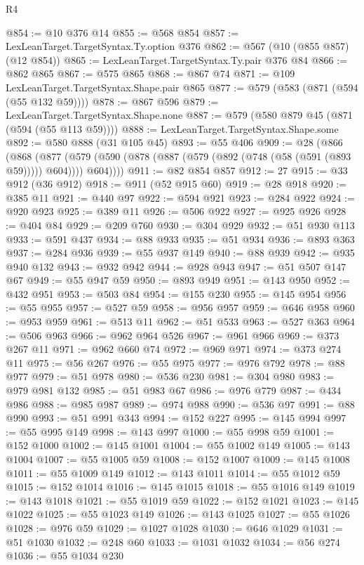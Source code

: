 \begin{lexlean}{R4}
\begin{coremodule}
@854 := @10 @376 @14
@855 := @568 @854
@857 := LexLeanTarget.TargetSyntax.Ty.option @376
@862 := @567 (@10 (@855 @857) (@12 @854))
@865 := LexLeanTarget.TargetSyntax.Ty.pair @376 @84
@866 := @862 @865
@867 := @575 @865
@868 := @867 @74
@871 := @109 LexLeanTarget.TargetSyntax.Shape.pair @865
@877 := @579 (@583 (@871 (@594 (@55 @132 @59))))
@878 := @867 @596
@879 := LexLeanTarget.TargetSyntax.Shape.none
@887 := @579 (@580 @879 @45 (@871 (@594 (@55 @113 @59))))
@888 := LexLeanTarget.TargetSyntax.Shape.some
@892 := @580 @888 (@31 @105 @45)
@893 := @55 @406
@909 := @28
    (@866
      (@868
        (@877 (@579 (@590 (@878 (@887 (@579 (@892 (@748 (@58 (@591 (@893 @59))))) @604)))) @604))))
@911 := @82 @854 @857
@912 := 27
@915 := @33 @912 (@36 @912)
@918 := @911 (@52 @915 @60)
@919 := @28 @918
@920 := @385 @11
@921 := @440 @97
@922 := @594 @921
@923 := @284 @922
@924 := @920 @923
@925 := @389 @11
@926 := @506 @922
@927 := @925 @926
@928 := @404 @84
@929 := @209 @760
@930 := @304 @929
@932 := @51 @930 @113
@933 := @591 @437
@934 := @88 @933
@935 := @51 @934
@936 := @893 @363
@937 := @284 @936
@939 := @55 @937 @149
@940 := @88 @939
@942 := @935 @940 @132
@943 := @932 @942
@944 := @928 @943
@947 := @51 @507 @147 @67
@949 := @55 @947 @59
@950 := @893 @949
@951 := @143 @950
@952 := @432 @951
@953 := @503 @84
@954 := @155 @230
@955 := @145 @954
@956 := @55 @955
@957 := @527 @59
@958 := @956 @957
@959 := @646 @958
@960 := @953 @959
@961 := @513 @11
@962 := @51 @533
@963 := @527 @363
@964 := @506 @963
@966 := @962 @964 @526
@967 := @961 @966
@969 := @373 @267 @11
@971 := @962 @660 @74
@972 := @969 @971
@974 := @373 @274 @11
@975 := @56 @267
@976 := @55 @975
@977 := @976 @792
@978 := @88 @977
@979 := @51 @978
@980 := @536 @230
@981 := @304 @980
@983 := @979 @981 @132
@985 := @51 @983 @67
@986 := @976 @779
@987 := @434 @986
@988 := @985 @987
@989 := @974 @988
@990 := @536 @97
@991 := @88 @990
@993 := @51 @991 @343
@994 := @152 @227
@995 := @145 @994
@997 := @55 @995 @149
@998 := @143 @997
@1000 := @55 @998 @59
@1001 := @152 @1000
@1002 := @145 @1001
@1004 := @55 @1002 @149
@1005 := @143 @1004
@1007 := @55 @1005 @59
@1008 := @152 @1007
@1009 := @145 @1008
@1011 := @55 @1009 @149
@1012 := @143 @1011
@1014 := @55 @1012 @59
@1015 := @152 @1014
@1016 := @145 @1015
@1018 := @55 @1016 @149
@1019 := @143 @1018
@1021 := @55 @1019 @59
@1022 := @152 @1021
@1023 := @145 @1022
@1025 := @55 @1023 @149
@1026 := @143 @1025
@1027 := @55 @1026
@1028 := @976 @59
@1029 := @1027 @1028
@1030 := @646 @1029
@1031 := @51 @1030
@1032 := @248 @60
@1033 := @1031 @1032
@1034 := @56 @274
@1036 := @55 @1034 @230

\end{coremodule}
\end{lexlean}
